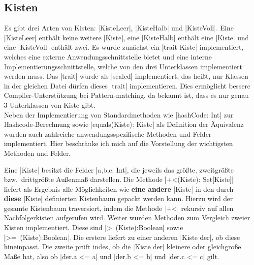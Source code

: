 \subsection{Kisten}
 Es gibt drei Arten von Kisten: |KisteLeer|, |KisteHalb| und |KisteVoll|.
 Eine |KisteLeer| enthält keine weitere |Kiste|, eine |KisteHalb| enthält eine |Kiste| und eine |KisteVoll| enthält zwei.
 Es wurde zunächst ein |trait Kiste| implementiert, welches eine externe Anwendungsschnittstelle bietet und eine interne Implementierungsschnittstelle,
 welche von den drei Unterklassen implementiert werden muss.
 Das |trait| wurde als |sealed| implementiert, das heißt, nur Klassen in der gleichen Datei dürfen dieses |trait| implementieren.
 Dies ermöglicht bessere Compiler-Unterstützung bei Pattern-matching, da bekannt ist, dass es nur genau 3 Unterklassen von Kiste gibt. \\
 Neben der Implementierung von Standardmethoden wie |hashCode: Int| zur Hashcode-Berechnung sowie |equals(Kiste): Kiste| als Definition der Äquivalenz
  wurden auch zahlreiche anwendungsspezifische Methoden und Felder implementiert.
 Hier beschränke ich mich auf die Vorstellung der wichtigsten Methoden und Felder.

 Eine |Kiste| besitzt die Felder |a,b,c: Int|, die jeweils das größte, zweitgrößte bzw.\ drittgrößte Außenmaß darstellen.
 Die Methode |+<(Kiste): Set[Kiste]| liefert als Ergebnis alle Möglichkeiten wie \textbf{eine andere} |Kiste| in den durch \textbf{diese} |Kiste| definierten Kistenbaum
  gepackt werden kann. Hierzu wird der gesamte Kistenbaum traversiert, indem die Methode |+<| rekursiv auf allen Nachfolgerkisten aufgerufen wird.
 Weiter wurden Methoden zum Vergleich zweier Kisten implementiert. Diese sind |>~(Kiste):Boolean| sowie |>=~(Kiste):Boolean|.
 Die erstere liefert zu einer anderen |Kiste der|, ob diese hineinpasst.
 Die zweite prüft indes, ob die |Kiste der| kleinere oder gleichgroße Maße hat, also ob |der.a <= a| und |der.b <= b| und |der.c <= c| gilt.
